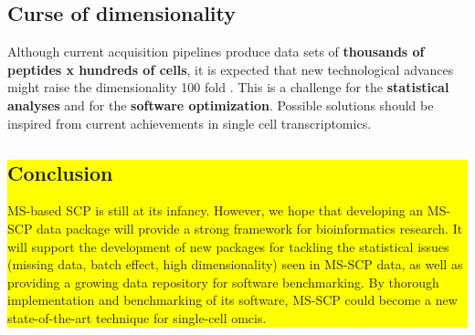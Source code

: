 \documentclass{article}
\begin{document}
\begin{multicols}{2}
\begin{minipage}[t]{\linewidth}
  \subsection*{Curse of dimensionality}
  \large
  Although current acquisition pipelines produce data sets of \textbf{thousands of peptides x hundreds of cells}, it is expected that new technological advances might raise the dimensionality 100 fold \cite{Specht2019-jm}. This is a challenge for the \textbf{statistical analyses} and for the \textbf{software optimization}. Possible solutions should be inspired from current achievements in single cell transcriptomics. 
\end{minipage}

\vspace{.4cm}
\noindent
\colorbox{yellow}{
  \begin{minipage}[t]{0.965\linewidth}
    \vspace{.15cm}
    \section*{\huge Conclusion}
    \large 
    MS-based SCP is still at its infancy. However, we hope that developing an MS-SCP data package will provide a strong framework for bioinformatics research. It will support the development of new packages for tackling the statistical issues (missing data, batch effect, high dimensionality) seen in MS-SCP data, as well as providing a growing data repository for software benchmarking. By thorough implementation and benchmarking of its software, MS-SCP could become a new state-of-the-art technique for single-cell omcis.
  \end{minipage}
}

\scriptsize
 



\end{multicols}
\end{document}
